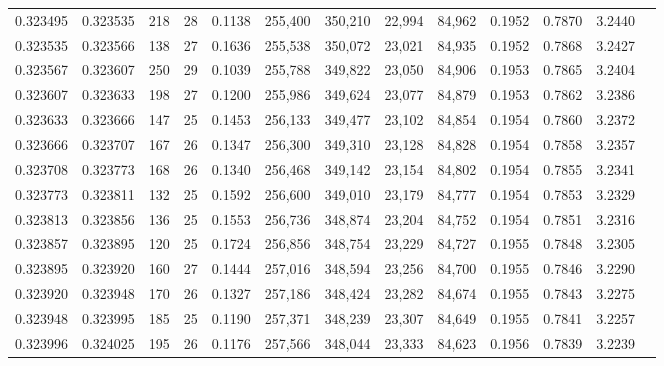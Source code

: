 \begin{tabular}{rrrrrrrrrrrrr}
0.323495 & 0.323535 &   218 &  28 &                                     0.1138 & 255,400 & 350,210 &  22,994 &  84,962 & 0.1952 & 0.7870 & 3.2440 \\
0.323535 & 0.323566 &   138 &  27 &                                     0.1636 & 255,538 & 350,072 &  23,021 &  84,935 & 0.1952 & 0.7868 & 3.2427 \\
0.323567 & 0.323607 &   250 &  29 &                                     0.1039 & 255,788 & 349,822 &  23,050 &  84,906 & 0.1953 & 0.7865 & 3.2404 \\
0.323607 & 0.323633 &   198 &  27 &                                     0.1200 & 255,986 & 349,624 &  23,077 &  84,879 & 0.1953 & 0.7862 & 3.2386 \\
0.323633 & 0.323666 &   147 &  25 &                                     0.1453 & 256,133 & 349,477 &  23,102 &  84,854 & 0.1954 & 0.7860 & 3.2372 \\
0.323666 & 0.323707 &   167 &  26 &                                     0.1347 & 256,300 & 349,310 &  23,128 &  84,828 & 0.1954 & 0.7858 & 3.2357 \\
0.323708 & 0.323773 &   168 &  26 &                                     0.1340 & 256,468 & 349,142 &  23,154 &  84,802 & 0.1954 & 0.7855 & 3.2341 \\
0.323773 & 0.323811 &   132 &  25 &                                     0.1592 & 256,600 & 349,010 &  23,179 &  84,777 & 0.1954 & 0.7853 & 3.2329 \\
0.323813 & 0.323856 &   136 &  25 &                                     0.1553 & 256,736 & 348,874 &  23,204 &  84,752 & 0.1954 & 0.7851 & 3.2316 \\
0.323857 & 0.323895 &   120 &  25 &                                     0.1724 & 256,856 & 348,754 &  23,229 &  84,727 & 0.1955 & 0.7848 & 3.2305 \\
0.323895 & 0.323920 &   160 &  27 &                                     0.1444 & 257,016 & 348,594 &  23,256 &  84,700 & 0.1955 & 0.7846 & 3.2290 \\
0.323920 & 0.323948 &   170 &  26 &                                     0.1327 & 257,186 & 348,424 &  23,282 &  84,674 & 0.1955 & 0.7843 & 3.2275 \\
0.323948 & 0.323995 &   185 &  25 &                                     0.1190 & 257,371 & 348,239 &  23,307 &  84,649 & 0.1955 & 0.7841 & 3.2257 \\
0.323996 & 0.324025 &   195 &  26 &                                     0.1176 & 257,566 & 348,044 &  23,333 &  84,623 & 0.1956 & 0.7839 & 3.2239 \\

\end{tabular}
